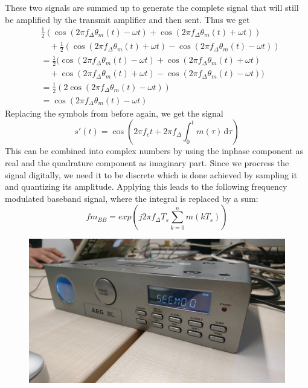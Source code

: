 \documentclass[sigconf]{acmart}
\begin{document}
These two signals are summed up to generate the complete signal that will still be amplified by the 
transmit amplifier and then sent. Thus we get 
\begin{align*}
&\frac{1}{2}(\cos (2 \pi f_\Delta \theta_m (t) - \omega t) + \cos (2 \pi f_\Delta \theta_m (t)+ \omega t))\\
&\hspace{1em}+ \frac{1}{2}(\cos (2 \pi f_\Delta \theta_m (t) + \omega t) - \cos (2 \pi f_\Delta \theta_m (t) - \omega t))\\
&= \frac{1}{2}(\cos (2 \pi f_\Delta \theta_m (t) - \omega t) + \cos (2 \pi f_\Delta \theta_m (t)+ \omega t)\\
&\hspace{1em}+ \cos (2 \pi f_\Delta \theta_m (t) + \omega t) - \cos (2 \pi f_\Delta \theta_m (t) - \omega t))\\
&= \frac{1}{2}(2 \cos (2 \pi f_\Delta \theta_m (t) - \omega t))\\
&= \cos (2 \pi f_\Delta \theta_m (t) - \omega t)
\end{align*}
Replacing the symbols from before again, we get the signal
\[
s'(t) = \cos (2 \pi f_c t + 2 \pi f_\Delta \int_0^t m(\tau)\,\mathrm{d}\tau)
\]
This can be combined into complex numbers by using the inphase component as real and the quadrature
component as imaginary part. Since we procress the signal digitally, we need it to be discrete which is
done achieved by sampling it and quantizing its amplitude. Applying this leads to the following frequency
modulated baseband signal, where the integral is replaced by a sum:
\[
fm_{BB} = exp(j2\pi f_\Delta T_s \sum_{k=0}^n m(kT_s))
\]

\begin{figure}[tb!]
	\includegraphics[width=1\linewidth]{radio_display.png}
	\caption{}
	\label{fig:rds_filt_plot}
\end{figure}
\end{document}
